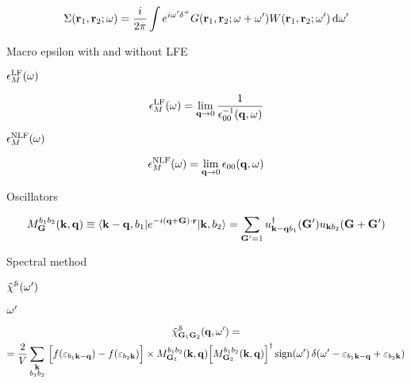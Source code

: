 \documentclass[a4paper,reqno,11pt,twoside]{book}
\begin{document}
\begin{equation}
\label{eq:GW_space_frequency}
\Sigma({\bf r}_1,{\bf r}_2;\omega) = 
\dfrac{i}{{2\pi}} \int e^{i\omega'\delta^+} G({\bf r}_1,{\bf r}_2;\omega+\omega') W({\bf r}_1,{\bf r}_2;\omega'){\,\text{d}}\omega'
\end{equation}



 Macro epsilon with and without LFE

$\epsilon_M^{\text{LF}}(\omega)$

\begin{equation}
\label{eq:abs_LFE}
\epsilon_M^{\text{LF}}(\omega) = \lim_{{\bf q} {\rightarrow} 0} \dfrac{1}{\epsilon^{-1}_{0 0}({\bf q},\omega)}
\end{equation}

$\epsilon_M^{\text{NLF}}(\omega)$

\begin{equation}
\label{eq:abs_NLFE}
\epsilon_M^{\text{NLF}}(\omega) = \lim_{{\bf q} {\rightarrow} 0} {\epsilon_{0 0}({\bf q},\omega)}
\end{equation}


 Oscillators

\begin{equation}
\label{eq:def_oscillator}
M^{b_1b_2}_{\bf G} ({\bf k},{\bf q}) \equiv
\langle{{\bf k}-{\bf q}},b_1|e^{-i({\bf q}+{\bf G})\cdot{\bf r}}|{\bf k},b_2\rangle = 
 \sum_{{\bf G}'=1} 
 u_{{{\bf k}-{\bf q}} b_1}^\dagger({\bf G}')u_{{\bf k} b_2}({\bf G}+{\bf G}')
\end{equation}

 Spectral method

${{\tilde\chi}}^{\mathcal{S}}(\omega')$ 

$\omega'$


\begin{multline}
\label{eq:im_part_chi0}
 {{\tilde\chi}}^{\mathcal{S}}_{{\bf G}_1{\bf G}_2}({\bf q},\omega') = \\
 = \dfrac{2}{V} \sum_{\substack{{\bf k} \\ b_1 b_2}} \,
 \,\Bigl[ f(\varepsilon_{b_1{{\bf k}-{\bf q}}})-f(\varepsilon_{b_2{\bf k}}) \Bigr]
 \times 
 M^{b_1 b_2}_{{\bf G}_1}({\bf k},{\bf q}) \Bigl[{M^{b_1 b_2}_{{\bf G}_2}}({\bf k},{\bf q})\Bigr]^\dagger\,
 {{\text{sign}}(\omega')\,
 \delta(\omega'-\varepsilon_{b_1{{\bf k}-{\bf q}}}+\varepsilon_{b_2{\bf k}})}
\end{multline}
\end{document}
